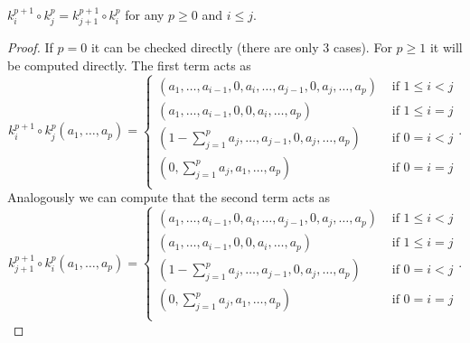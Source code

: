 \begin{lem}
	$k_i^{p+1} \circ k_j^p = k_{j+1}^{p+1} \circ k_{i}^p$ for any $p \geq 0$ and $i \leq j$.
\end{lem} 
\begin{proof}
	If $p = 0$ it can be checked directly (there are only 3 cases).
	For $p \geq 1$ it will be computed directly.
	The first term acts as
	\begin{equation}
		k_i^{p+1} \circ k_j^p (a_1, \ldots, a_p) =
	\begin{cases}
		\left( a_1, \ldots, a_{i-1}, 0, a_i, \ldots, a_{j-1}, 0, a_j, \ldots, a_p \right) & \text{ if } 1 \leq i < j\\
		\left( a_1, \ldots, a_{i-1}, 0, 0, a_i, \ldots, a_p \right) & \text{ if } 1 \leq i = j\\
		\left( 1 - \sum_{j=1}^{p} a_j, \ldots, a_{j-1}, 0, a_j, \ldots, a_p \right) &\text{ if } 0 = i < j\\
		\left( 0, \sum_{j=1}^{p} a_j, a_1, \ldots, a_p \right) &\text{ if } 0 = i = j\\
	\end{cases} 
	.\end{equation} 
	Analogously we can compute that the second term acts as
	\begin{equation}
		k_{j+1}^{p+1} \circ k_i^p (a_1, \ldots, a_p) =
	\begin{cases}
		\left( a_1, \ldots, a_{i-1}, 0, a_i, \ldots, a_{j-1}, 0, a_j, \ldots, a_p \right) & \text{ if } 1 \leq i < j\\
		\left( a_1, \ldots, a_{i-1}, 0, 0, a_i, \ldots, a_p \right) & \text{ if } 1 \leq i = j\\
		\left( 1 - \sum_{j=1}^{p} a_j, \ldots, a_{j-1}, 0, a_j, \ldots, a_p \right) &\text{ if } 0 = i < j\\
		\left( 0, \sum_{j=1}^{p} a_j, a_1, \ldots, a_p \right) &\text{ if } 0 = i = j\\
	\end{cases} 
	.\end{equation} 
\end{proof}

